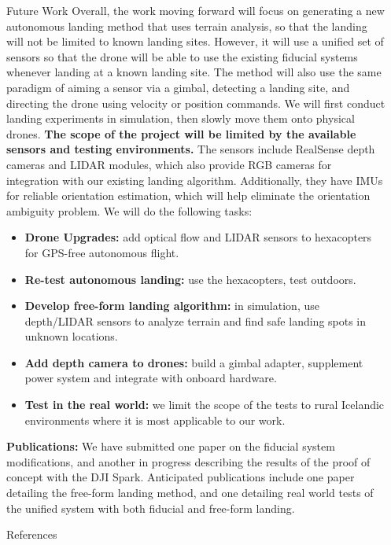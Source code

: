 \documentclass[final, 20pt]{beamer}
\newlength{\sepwidth}
\newlength{\colwidth}
\newcommand{\separatorcolumn}{\begin{column}{\sepwidth}\end{column}}
\begin{document}
\begin{frame}[t]
\begin{columns}[t]
\begin{column}{\colwidth}
\begin{block}{Future Work}
      Overall, the work moving forward will focus on generating a new autonomous landing method that uses terrain analysis,
      so that the landing will not be limited to known landing sites.
      However, it will use a unified set of sensors so that the drone will be able to use the existing fiducial systems
      whenever landing at a known landing site.
      The method will also use the same paradigm of aiming a sensor via a gimbal, detecting a landing site,
      and directing the drone using velocity or position commands.
      We will first conduct landing experiments in simulation, then slowly move them onto physical drones.
      \textbf{The scope of the project will be limited by the available sensors and testing environments.}
      The sensors include RealSense depth cameras and LIDAR modules, which also provide RGB cameras for integration with our existing landing algorithm.
      Additionally, they have IMUs for reliable orientation estimation, which will help eliminate the orientation ambiguity problem.
      We will do the following tasks:
      \vspace*{-0.5cm}
    \begin{itemize}
        \item \textbf{Drone Upgrades:} add optical flow and LIDAR sensors to hexacopters for GPS-free autonomous flight.
        \item \textbf{Re-test autonomous landing:} use the hexacopters, test outdoors.
        \item \textbf{Develop free-form landing algorithm:} in simulation, use depth/LIDAR sensors to analyze terrain and find safe landing spots in unknown locations.
        \item \textbf{Add depth camera to drones:} build a gimbal adapter, supplement power system and integrate with onboard hardware.
        \item \textbf{Test in the real world:} we limit the scope of the tests to rural Icelandic environments where it is most applicable to our work.
    \end{itemize}
    \vspace*{-0.5cm}
    \textbf{Publications:} We have submitted one paper on the fiducial system modifications, and another in progress describing the results of the proof of concept with the DJI Spark.
      Anticipated publications include one paper detailing the free-form landing method, and one detailing real world tests of the unified system with both fiducial and free-form landing.

  \end{block}



  \begin{block}{References}

    \nocite{*}
    \footnotesize{}

  \end{block}

\end{column}

\separatorcolumn
\end{columns}
\end{frame}
\end{document}
